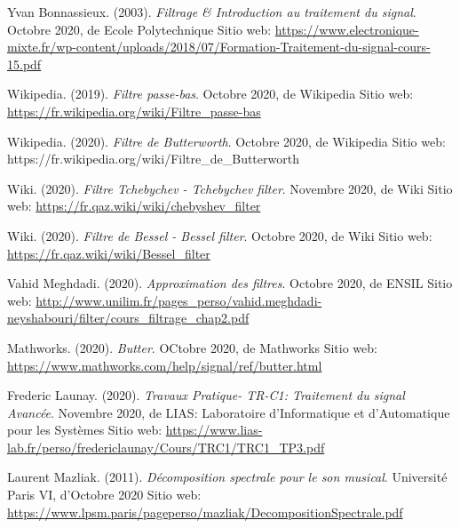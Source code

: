 \documentclass[conference,onecolumn]{IEEEtran}
\begin{document}
\begin{flushleft}
\begin{thebibliography}{100}
Yvan Bonnassieux. (2003).
\textit{Filtrage \& Introduction au traitement du signal}. Octobre 2020, de Ecole Polytechnique Sitio web: \href{https://www.electronique-mixte.fr/wp-content/uploads/2018/07/Formation-Traitement-du-signal-cours-15.pdf}{https://www.electronique-mixte.fr/wp-content/uploads/2018/07/Formation-Traitement-du-signal-cours-15.pdf}

Wikipedia. (2019).
\textit{Filtre passe-bas}. Octobre 2020, de Wikipedia Sitio web: \href{https://fr.wikipedia.org/wiki/Filtre\_passe-bas}{https://fr.wikipedia.org/wiki/Filtre\_passe-bas}

Wikipedia. (2020).
\textit{Filtre de Butterworth}. Octobre 2020, de Wikipedia Sitio web: https://fr.wikipedia.org/wiki/Filtre\_de\_Butterworth

Wiki. (2020).
\textit{Filtre Tchebychev - Tchebychev filter}. Novembre 2020, de Wiki Sitio web: \href{https://fr.qaz.wiki/wiki/chebyshev\_filter}{https://fr.qaz.wiki/wiki/chebyshev\_filter}

Wiki. (2020).
\textit{Filtre de Bessel - Bessel filter}. Octobre 2020, de Wiki Sitio web: \href{https://fr.qaz.wiki/wiki/Bessel\_filter}{https://fr.qaz.wiki/wiki/Bessel\_filter}

Vahid Meghdadi. (2020).
\textit{Approximation des filtres}. Octobre 2020, de ENSIL Sitio web: \href{http://www.unilim.fr/pages\_perso/vahid.meghdadi-neyshabouri/filter/cours\_filtrage\_chap2.pdf}{http://www.unilim.fr/pages\_perso/vahid.meghdadi-neyshabouri/filter/cours\_filtrage\_chap2.pdf}

Mathworks. (2020).
\textit{Butter}. OCtobre 2020, de Mathworks Sitio web: \href{https://www.mathworks.com/help/signal/ref/butter.html}{https://www.mathworks.com/help/signal/ref/butter.html}

Frederic Launay. (2020).
\textit{Travaux Pratique- TR-C1: Traitement du signal Avancée}. Novembre 2020, de LIAS: Laboratoire d'Informatique et d'Automatique pour les Systèmes Sitio web: \href{https://www.lias-lab.fr/perso/fredericlaunay/Cours/TRC1/TRC1\_TP3.pdf}{https://www.lias-lab.fr/perso/fredericlaunay/Cours/TRC1/TRC1\_TP3.pdf}

Laurent Mazliak. (2011).
\textit{Décomposition spectrale pour le son musical}. Université Paris VI, d’Octobre 2020 Sitio web: \href{https://www.lpsm.paris/pageperso/mazliak/DecompositionSpectrale.pdf}{https://www.lpsm.paris/pageperso/mazliak/DecompositionSpectrale.pdf}


\end{thebibliography}
\end{flushleft}
\end{document}

